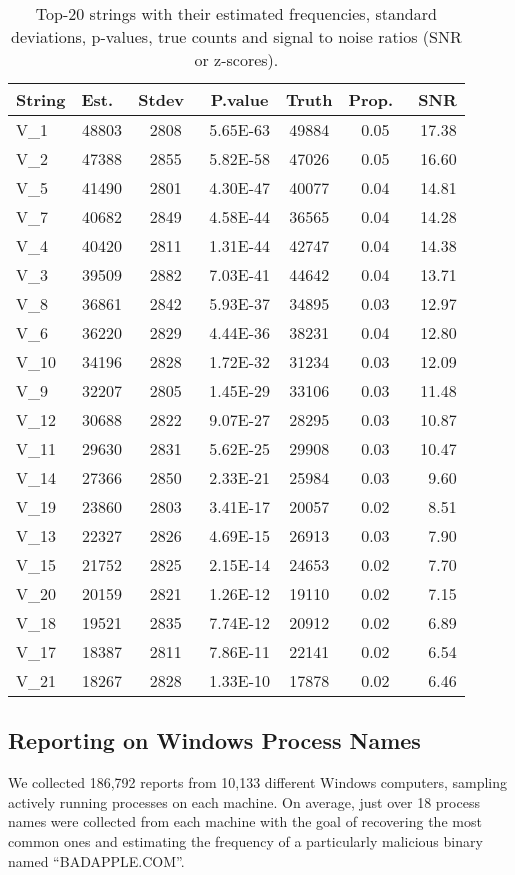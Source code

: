 \documentclass{sig-alternate-2013}
\begin{document}
\begin{table}[!h]
\centering
\begin{tabular}{lcccccr}
  \hline
String & Est.\ & Stdev\ & P.value & Truth & Prop.\ & SNR \\ 
  \hline
V\_1 & 48803 & 2808 & 5.65E-63 & 49884 & 0.05 & 17.38 \\ 
  V\_2 & 47388 & 2855 & 5.82E-58 & 47026 & 0.05 & 16.60 \\ 
  V\_5 & 41490 & 2801 & 4.30E-47 & 40077 & 0.04 & 14.81 \\ 
  V\_7 & 40682 & 2849 & 4.58E-44 & 36565 & 0.04 & 14.28 \\ 
  V\_4 & 40420 & 2811 & 1.31E-44 & 42747 & 0.04 & 14.38 \\ 
  V\_3 & 39509 & 2882 & 7.03E-41 & 44642 & 0.04 & 13.71 \\ 
  V\_8 & 36861 & 2842 & 5.93E-37 & 34895 & 0.03 & 12.97 \\ 
  V\_6 & 36220 & 2829 & 4.44E-36 & 38231 & 0.04 & 12.80 \\ 
  V\_10 & 34196 & 2828 & 1.72E-32 & 31234 & 0.03 & 12.09 \\ 
  V\_9 & 32207 & 2805 & 1.45E-29 & 33106 & 0.03 & 11.48 \\ 
  V\_12 & 30688 & 2822 & 9.07E-27 & 28295 & 0.03 & 10.87 \\ 
  V\_11 & 29630 & 2831 & 5.62E-25 & 29908 & 0.03 & 10.47 \\ 
  V\_14 & 27366 & 2850 & 2.33E-21 & 25984 & 0.03 & 9.60 \\ 
  V\_19 & 23860 & 2803 & 3.41E-17 & 20057 & 0.02 & 8.51 \\ 
  V\_13 & 22327 & 2826 & 4.69E-15 & 26913 & 0.03 & 7.90 \\ 
  V\_15 & 21752 & 2825 & 2.15E-14 & 24653 & 0.02 & 7.70 \\ 
  V\_20 & 20159 & 2821 & 1.26E-12 & 19110 & 0.02 & 7.15 \\ 
  V\_18 & 19521 & 2835 & 7.74E-12 & 20912 & 0.02 & 6.89 \\ 
  V\_17 & 18387 & 2811 & 7.86E-11 & 22141 & 0.02 & 6.54 \\ 
  V\_21 & 18267 & 2828 & 1.33E-10 & 17878 & 0.02 & 6.46 \\ 
   \hline
\end{tabular}
\caption{Top-20 strings with their estimated frequencies, standard deviations, p-values, true counts and signal to noise ratios (SNR or z-scores).}
\label{tab:results20}
\end{table}

\subsection{Reporting on Windows Process Names}\label{sec:windows}
We collected 186,792 reports from 10,133 different Windows computers, sampling actively running
processes on each machine. On average, just over 18 process names were collected from each machine with the goal of recovering the most common ones and estimating the frequency of a particularly malicious binary named ``BADAPPLE.COM''.
\end{document}
